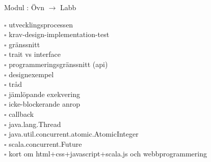 
Modul : Övn  $\rightarrow$ Labb 
\begin{multicols}{3}\SlideFontTiny
$\square$ utvecklingsprocessen \\
$\square$ krav-design-implementation-test \\
$\square$ gränssnitt \\
$\square$ trait vs interface \\
$\square$ programmeringsgränssnitt (api) \\
$\square$ designexempel \\
$\square$ tråd \\
$\square$ jämlöpande exekvering \\
$\square$ icke-blockerande anrop \\
$\square$ callback \\
$\square$ java.lang.Thread \\
$\square$ java.util.concurrent.atomic.AtomicInteger \\
$\square$ scala.concurrent.Future \\
$\square$ kort om html+css+javascript+scala.js och webbprogrammering \\     
\end{multicols}
